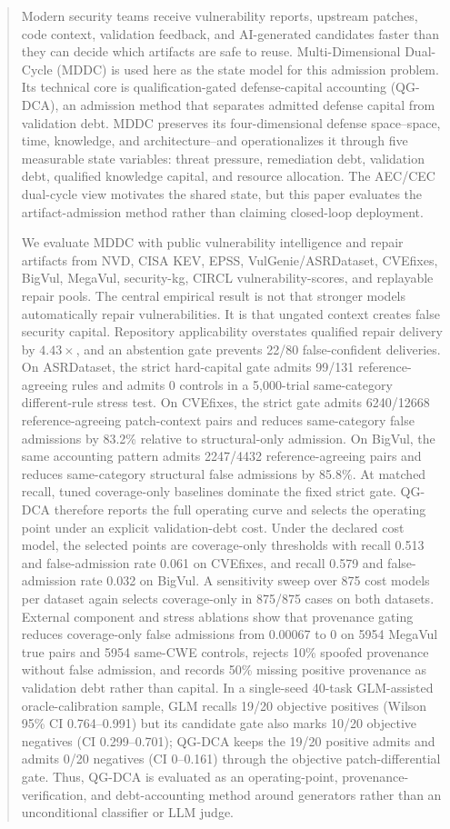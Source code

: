 ﻿\documentclass[lettersize,journal]{IEEEtran}
\begin{document}
\begin{abstract}
Modern security teams receive vulnerability reports, upstream patches, code context, validation feedback, and AI-generated candidates faster than they can decide which artifacts are safe to reuse. Multi-Dimensional Dual-Cycle (MDDC) is used here as the state model for this admission problem. Its technical core is qualification-gated defense-capital accounting (QG-DCA), an admission method that separates admitted defense capital from validation debt. MDDC preserves its four-dimensional defense space--space, time, knowledge, and architecture--and operationalizes it through five measurable state variables: threat pressure, remediation debt, validation debt, qualified knowledge capital, and resource allocation. The AEC/CEC dual-cycle view motivates the shared state, but this paper evaluates the artifact-admission method rather than claiming closed-loop deployment.

We evaluate MDDC with public vulnerability intelligence and repair artifacts from NVD, CISA KEV, EPSS, VulGenie/ASRDataset, CVEfixes, BigVul, MegaVul, security-kg, CIRCL vulnerability-scores, and replayable repair pools. The central empirical result is not that stronger models automatically repair vulnerabilities. It is that ungated context creates false security capital. Repository applicability overstates qualified repair delivery by $4.43\times$, and an abstention gate prevents 22/80 false-confident deliveries. On ASRDataset, the strict hard-capital gate admits 99/131 reference-agreeing rules and admits 0 controls in a 5,000-trial same-category different-rule stress test. On CVEfixes, the strict gate admits 6240/12668 reference-agreeing patch-context pairs and reduces same-category false admissions by 83.2\% relative to structural-only admission. On BigVul, the same accounting pattern admits 2247/4432 reference-agreeing pairs and reduces same-category structural false admissions by 85.8\%. At matched recall, tuned coverage-only baselines dominate the fixed strict gate. QG-DCA therefore reports the full operating curve and selects the operating point under an explicit validation-debt cost. Under the declared cost model, the selected points are coverage-only thresholds with recall 0.513 and false-admission rate 0.061 on CVEfixes, and recall 0.579 and false-admission rate 0.032 on BigVul. A sensitivity sweep over 875 cost models per dataset again selects coverage-only in 875/875 cases on both datasets. External component and stress ablations show that provenance gating reduces coverage-only false admissions from 0.00067 to 0 on 5954 MegaVul true pairs and 5954 same-CWE controls, rejects 10\% spoofed provenance without false admission, and records 50\% missing positive provenance as validation debt rather than capital. In a single-seed 40-task GLM-assisted oracle-calibration sample, GLM recalls 19/20 objective positives (Wilson 95\% CI 0.764--0.991) but its candidate gate also marks 10/20 objective negatives (CI 0.299--0.701); QG-DCA keeps the 19/20 positive admits and admits 0/20 negatives (CI 0--0.161) through the objective patch-differential gate. Thus, QG-DCA is evaluated as an operating-point, provenance-verification, and debt-accounting method around generators rather than an unconditional classifier or LLM judge.


\end{abstract}
\end{document}
